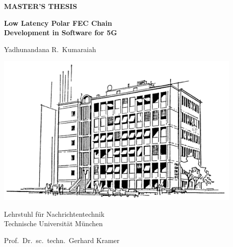 \documentclass[BCOR10mm]{scrreprt}
\newcommand{\coversheetSubject}[1]{{\large\textbf{\MakeUppercase{#1}}\par}}
\newcommand{\coversheetTitle}[1]{{\Huge\textbf{#1}\par}}
\newcommand{\coversheetAuthor}[1]{{\LARGE#1\par}}
\begin{document}
    \thispagestyle{empty}
    \sffamily
    \parindent0mm

    \vspace*{1.5cm}
    \begin{minipage}[t][9.5cm][t]{\textwidth}
        \begin{center}

            \coversheetSubject{Master's Thesis}

            \par\bigskip\bigskip

            \coversheetTitle{Low Latency Polar FEC Chain \\Development in Software for 5G}

            \par\bigskip\bigskip

            \coversheetAuthor{Yadhunandana R.\ Kumaraiah}

        \end{center}
    \end{minipage}

    \begin{minipage}[t][9cm][t]{\textwidth}
        \begin{center}
            \includegraphics[width=12cm]{figures-template/sketch-n4.png}

            \par\bigskip\bigskip

            {\Large Lehrstuhl für Nachrichtentechnik\\
            Technische Universität München\par}
            {\large Prof.\ Dr.\ sc.\ techn.\ Gerhard Kramer\Large\par}
        \end{center}
    \end{minipage}
\end{document}
